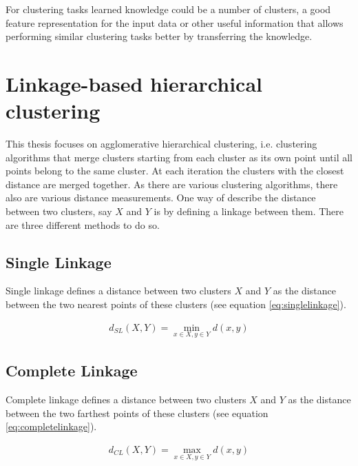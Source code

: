 For clustering tasks learned knowledge could be a number of clusters, a good feature representation for the input data or other useful information that allows performing similar clustering tasks better by transferring the knowledge.

\section{Linkage-based hierarchical clustering}

This thesis focuses on agglomerative hierarchical clustering, i.e. clustering algorithms that merge clusters starting from each cluster as its own point until all points belong to the same cluster. At each iteration the clusters with the closest distance are merged together. As there are various clustering algorithms, there also are various distance measurements. One way of describe the distance between two clusters, say $X$ and $Y$ is by defining a linkage between them. There are three different methods to do so.

\subsection{Single Linkage}

Single linkage defines a distance between two clusters $X$ and $Y$ as the distance between the two nearest points of these clusters (see equation \ref{eq:singlelinkage}).

\begin{equation}
    \begin{aligned}
        d_{SL}(X,Y) = \min\limits_{x \in X, y \in Y} d(x,y)
    \end{aligned}
    \label{eq:singlelinkage}
\end{equation}

\subsection{Complete Linkage}

Complete linkage defines a distance between two clusters $X$ and $Y$ as the distance between the two farthest points of these clusters (see equation \ref{eq:completelinkage}).

\begin{equation}
    \begin{aligned}
        d_{CL}(X,Y) = \max\limits_{x \in X, y \in Y} d(x,y)
    \end{aligned}
    \label{eq:completelinkage}
\end{equation}

